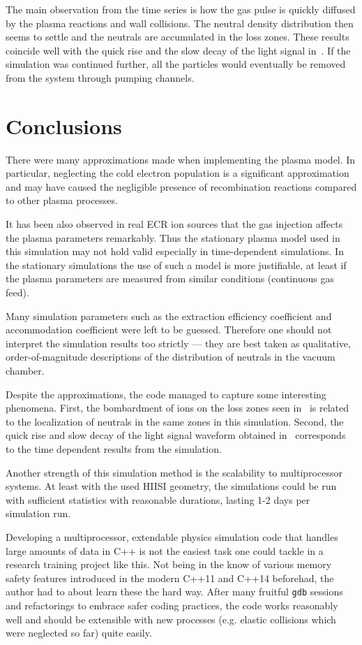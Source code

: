 \documentclass[a4paper,twoside,12pt]{article}
\begin{document}
The main observation from the time series is how the gas pulse is quickly
diffused by the plasma reactions and wall collisions. The neutral density
distribution then seems to settle and the neutrals are accumulated in the loss
zones. These results coincide well with the quick rise and the slow decay of
the light signal in~\cite{kronholm:ecr}. If the simulation was continued
further, all the particles would eventually be removed from the system through
pumping channels.

\section{Conclusions}

There were many approximations made when implementing the plasma model.
In particular, neglecting the cold electron population is a significant
approximation and may have caused the negligible presence of
recombination reactions compared to other plasma processes.

It has been also observed in real ECR ion sources that the gas injection
affects the plasma parameters remarkably. Thus the stationary plasma model used
in this simulation may not hold valid especially in time-dependent simulations.
In the stationary simulations the use of such a model is more justifiable, at
least if the plasma parameters are measured from similar conditions (continuous
gas feed).

Many simulation parameters such as the extraction efficiency coefficient and
accommodation coefficient were left to be guessed. Therefore one should not
interpret the simulation results too strictly --- they are best taken as
qualitative, order-of-magnitude descriptions of the distribution of neutrals in
the vacuum chamber.

Despite the approximations, the code managed to capture some interesting
phenomena. First, the bombardment of ions on the loss zones seen
in~\cite{kalvas:hiisi} is related to the localization of neutrals in the same
zones in this simulation. Second, the quick rise and slow decay of the light
signal waveform obtained in~\cite{kronholm:ecr} corresponds to the time
dependent results from the simulation.

Another strength of this simulation method is the scalability to multiprocessor
systems. At least with the used HIISI geometry, the simulations could be run
with sufficient statistics with reasonable durations, lasting 1-2 days per
simulation run.

Developing a multiprocessor, extendable physics simulation code that handles
large amounts of data in \textsc{C++} is not the easiest task one could tackle
in a research training project like this. Not being in the know of various
memory safety features introduced in the modern \textsc{C++11} and
\textsc{C++14} beforehad, the author had to about learn these the hard way.
After many fruitful \texttt{gdb} sessions and refactorings to embrace safer
coding practices, the code works reasonably well and should be extensible with
new processes (e.g. elastic collisions which were neglected so far) quite
easily.

\clearpage



\end{document}
